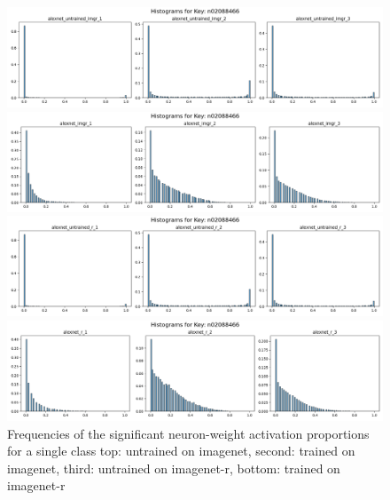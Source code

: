 \documentclass{article}
\begin{document}
    \begin{figure}[H]
        \centering
        \begin{minipage}{\textwidth}
            \centering
            \includegraphics[width=\textwidth]{alexnet_untrained_imgr_n02088466.png} %
            
        \end{minipage}\hfill
        \begin{minipage}{\textwidth}
            \centering
            \includegraphics[width=\textwidth]{alexnet_imgr_n02088466.png} %
        \end{minipage}
        \begin{minipage}{\textwidth}
            \centering
            \includegraphics[width=\textwidth]{alexnet_untrained_r_n02088466.png} %
            
        \end{minipage}\hfill
        \begin{minipage}{\textwidth}
            \centering
            \includegraphics[width=\textwidth]{alexnet_r_n02088466.png} %
        \end{minipage}
        
        \caption{Frequencies of the significant neuron-weight activation proportions for a single class top: untrained on imagenet, second: trained on imagenet, third: untrained on imagenet-r, bottom: trained on imagenet-r}
        \label{fig:frequency_neuron_weight1}
    \end{figure}
    
\end{document}
